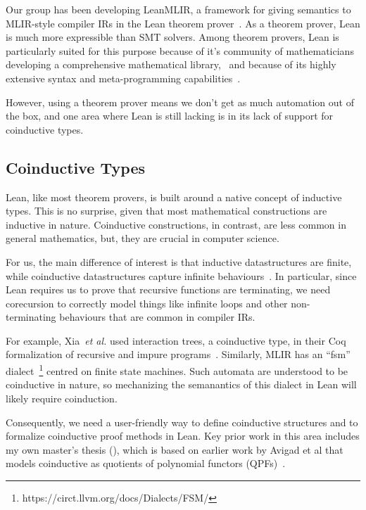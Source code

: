 \documentclass[a4paper]{scrartcl}
\newcommand*{\etal}{~\emph{et al.}}
\begin{document}
Our group has been developing
LeanMLIR, a framework for giving
semantics to MLIR-style compiler IRs in the Lean theorem prover~\cite{demouraLeanTheoremProver2015}. 
As a theorem prover, Lean is
much more expressible than SMT solvers. Among theorem provers, Lean is
particularly suited for this purpose because of it's community of
mathematicians developing a comprehensive mathematical library,~\cite{themathlibcommunityLeanMathematicalLibrary2020} 
and because of its highly extensive syntax and meta-programming capabilities~\cite{ullrichNotationsHygienicMacro2022, paulinoMetaprogrammingLean}.

However, using a theorem prover means we don't get as much automation
out of the box, and one area where Lean is still lacking is in its lack
of support for coinductive types.


\subsection{Coinductive Types}\label{coinductive-types}

Lean, like most theorem provers, is built around a native concept
of inductive types. This is no surprise, given that most mathematical
constructions are inductive in nature. Coinductive constructions, in
contrast, are less common in general mathematics, but, they are crucial
in computer science.

For us, the main difference of interest is that inductive datastructures
are finite, while coinductive datastructures capture infinite
behaviours~\cite{sangiorgiIntroductionBisimulationCoinduction2011}.
In particular, since Lean requires us to prove that recursive functions are
terminating, we need corecursion to correctly model things like infinite
loops and other non-terminating behaviours that are common in compiler
IRs.

For example, Xia\etal{} used interaction trees, a coinductive type, in
their Coq formalization of recursive and impure programs~\cite{xiaInteractionTreesRepresenting2020}.
Similarly, MLIR has an
``fsm'' dialect~\footnote{https://circt.llvm.org/docs/Dialects/FSM/}
centred on finite state machines. Such automata are understood to be
coinductive in nature, so mechanizing the semanantics of this dialect in
Lean will likely require coinduction.

Consequently, we need a user-friendly way to define coinductive
structures and to formalize coinductive proof methods in Lean. Key prior
work in this area includes my own master's thesis (\cite{keizerImplementingDefinitionalCo}), 
which is based on earlier
work by Avigad et al that models coinductive as quotients of polynomial
functors (QPFs)~\cite{avigadDataTypesQuotients2019}.
\end{document}
